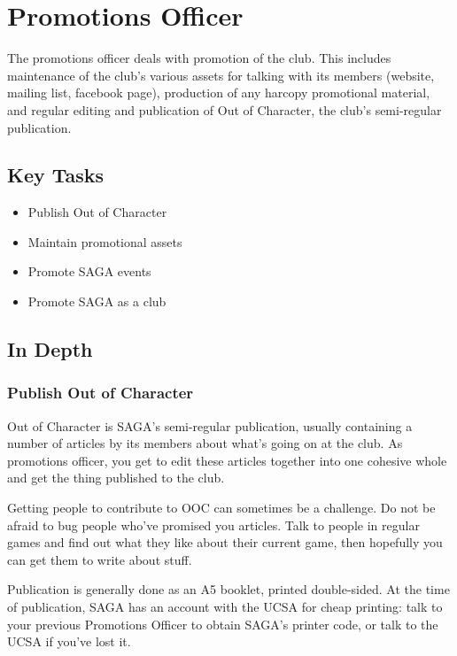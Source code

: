 \section{Promotions Officer}
\label{sec:promotions}

The promotions officer deals with promotion of the club. This includes maintenance of the club's various assets for talking with its members (website, mailing list, facebook page), production of any harcopy promotional material, and regular editing and publication of Out of Character, the club's semi-regular publication.

\subsection{Key Tasks}

\begin{itemize}
  \item Publish Out of Character
  \item Maintain promotional assets
  \item Promote SAGA events
  \item Promote SAGA as a club
\end{itemize}


\subsection{In Depth}

\subsubsection{Publish Out of Character}

Out of Character is SAGA's semi-regular publication, usually containing a number of articles by its members about what's going on at the club. As promotions officer, you get to edit these articles together into one cohesive whole and get the thing published to the club.

Getting people to contribute to OOC can sometimes be a challenge. Do not be afraid to bug people who've promised you articles. Talk to people in regular games and find out what they like about their current game, then hopefully you can get them to write about stuff.

Publication is generally done as an A5 booklet, printed double-sided. At the time of publication, SAGA has an account with the UCSA for cheap printing: talk to your previous Promotions Officer to obtain SAGA's printer code, or talk to the UCSA if you've lost it.

